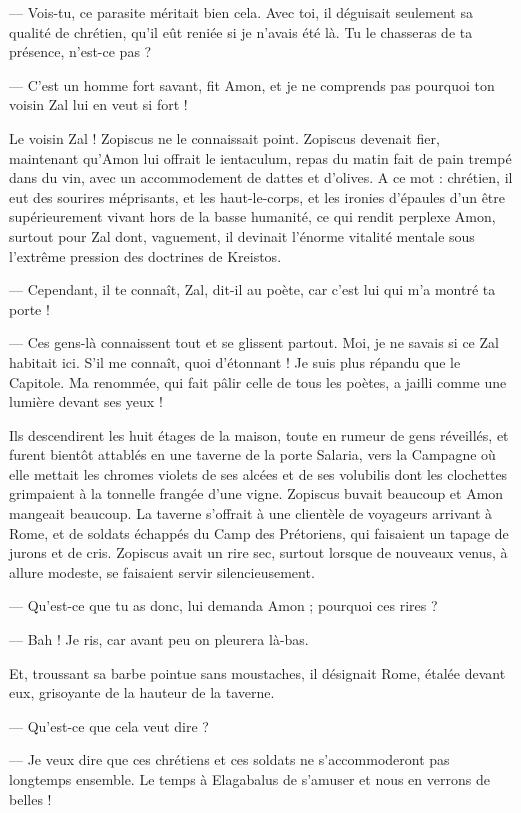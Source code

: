 \documentclass[a4paper, 11pt, oneside, polutonikogreek, french]{article}
\begin{document}
--- Vois-tu, ce parasite méritait bien cela. Avec toi, il déguisait seulement sa qualité de chrétien, qu'il eût reniée si je n'avais été là. Tu le chasseras de ta présence, n'est-ce pas ?

--- C'est un homme fort savant, fit Amon, et je ne comprends pas pourquoi ton voisin Zal lui en veut si fort !

Le voisin Zal ! Zopiscus ne le connaissait point. Zopiscus devenait fier, maintenant qu'Amon lui offrait le ientaculum, repas du matin fait de pain trempé dans du vin, avec un accommodement de dattes et d'olives. A ce mot : chrétien, il eut des sourires méprisants, et les haut-le-corps, et les ironies d'épaules d'un être supérieurement vivant hors de la basse humanité, ce qui rendit perplexe Amon, surtout pour Zal dont, vaguement, il devinait l'énorme vitalité mentale sous l'extrême pression des doctrines de Kreistos.

--- Cependant, il te connaît, Zal, dit-il au poète, car c'est lui qui m'a montré ta porte !

--- Ces gens-là connaissent tout et se glissent partout. Moi, je ne savais si ce Zal habitait ici. S'il me connaît, quoi d'étonnant ! Je suis plus répandu que le Capitole. Ma renommée, qui fait pâlir celle de tous les poètes, a jailli comme une lumière devant ses yeux !

Ils descendirent les huit étages de la maison, toute en rumeur de gens réveillés, et furent bientôt attablés en une taverne de la porte Salaria, vers la Campagne où elle mettait les chromes violets de ses alcées et de ses volubilis dont les clochettes grimpaient à la tonnelle frangée d'une vigne. Zopiscus buvait beaucoup et Amon mangeait beaucoup. La taverne s'offrait à une clientèle de voyageurs arrivant à Rome, et de soldats échappés du Camp des Prétoriens, qui faisaient un tapage de jurons et de cris. Zopiscus avait un rire sec, surtout lorsque de nouveaux venus, à allure modeste, se faisaient servir silencieusement.

--- Qu'est-ce que tu as donc, lui demanda Amon ; pourquoi ces rires ?

--- Bah ! Je ris, car avant peu on pleurera là-bas.

Et, troussant sa barbe pointue sans moustaches, il désignait Rome, étalée devant eux, grisoyante de la hauteur de la taverne.

--- Qu'est-ce que cela veut dire ?

--- Je veux dire que ces chrétiens et ces soldats ne s'accommoderont pas longtemps ensemble. Le temps à Elagabalus de s'amuser et nous en verrons de belles !
\end{document}
